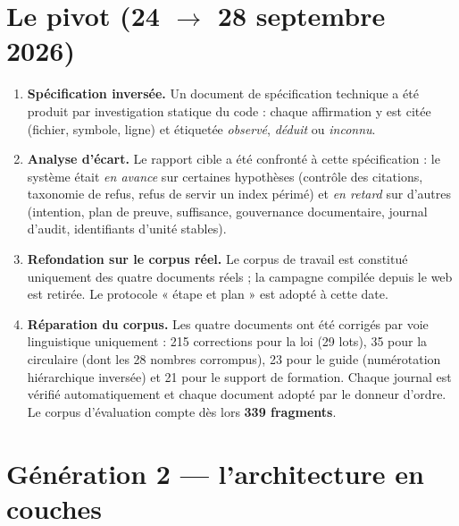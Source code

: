 \documentclass[a4paper,12pt]{report}
\begin{document}
\section{Le pivot (24 $\rightarrow$ 28 septembre 2026)}
\begin{enumerate}
  \item \textbf{Spécification inversée.} Un document de spécification technique a été produit par
        investigation statique du code : chaque affirmation y est citée (fichier, symbole, ligne)
        et étiquetée \emph{observé}, \emph{déduit} ou \emph{inconnu}.
  \item \textbf{Analyse d'écart.} Le rapport cible a été confronté à cette spécification : le
        système était \emph{en avance} sur certaines hypothèses (contrôle des citations, taxonomie
        de refus, refus de servir un index périmé) et \emph{en retard} sur d'autres (intention,
        plan de preuve, suffisance, gouvernance documentaire, journal d'audit, identifiants
        d'unité stables).
  \item \textbf{Refondation sur le corpus réel.} Le corpus de travail est constitué uniquement des
        quatre documents réels ; la campagne compilée depuis le web est retirée. Le protocole
        « étape et plan » est adopté à cette date.
  \item \textbf{Réparation du corpus.} Les quatre documents ont été corrigés par voie linguistique
        uniquement : 215 corrections pour la loi (29 lots), 35 pour la circulaire (dont les
        28 nombres corrompus), 23 pour le guide (numérotation hiérarchique inversée) et 21 pour le
        support de formation. Chaque journal est vérifié automatiquement et chaque document adopté
        par le donneur d'ordre. Le corpus d'évaluation compte dès lors \textbf{339 fragments}.
\end{enumerate}

\section{Génération 2 — l'architecture en couches}
\end{document}
